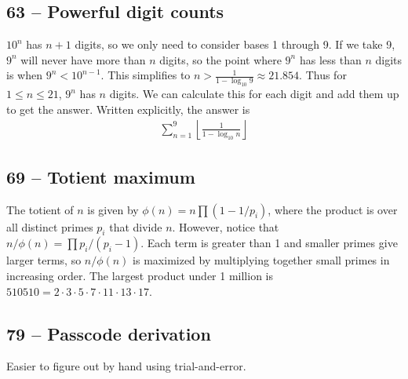 \documentclass{article}
\begin{document}
\subsection*{63 -- Powerful digit counts} 
$10^n$ has $n+1$ digits, so we only need to consider bases 1 through 9. 
If we take 9, $9^n$ will never have more than $n$ digits, so the point where $9^n$ has less than $n$ digits is when $9^n < 10^{n-1}$. 
This simplifies to $n > \frac{1}{1 - \log_{10}9} \approx 21.854$. 
Thus for $1 \leq n \leq 21$, $9^n$ has $n$ digits. 
We can calculate this for each digit and add them up to get the answer. Written explicitly, the answer is 
\begin{align*}
	\boxed{ \sum\limits_{n=1}^9 \left\lfloor \frac{1}{1 - \log_{10} n} \right\rfloor } 
\end{align*}


\subsection*{69 -- Totient maximum} 
The totient of $n$ is given by $\phi(n) =n \prod (1-1/p_i)$, where the product is over all distinct primes $p_i$ that divide $n$. 
However, notice that $n/\phi(n) = \prod p_i/(p_i -1)$. 
Each term is greater than 1 and smaller primes give larger terms, so $n/\phi(n)$ is maximized by multiplying together small primes in increasing order. The largest product under 1 million is $\boxed{510510} = 2 \cdot 3\cdot5\cdot7\cdot11\cdot13\cdot17$.


\subsection*{79 -- Passcode derivation} 
Easier to figure out by hand using trial-and-error. 
\end{document}
